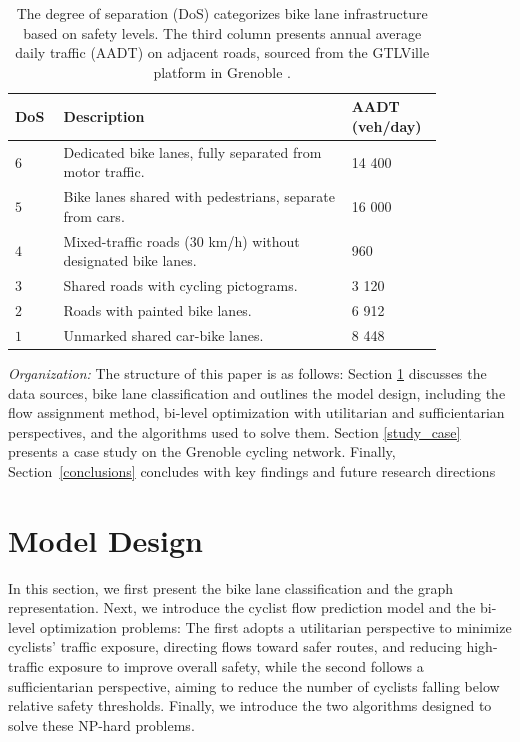 \documentclass[letterpaper, 10 pt, conference]{ieeeconf}  %
\begin{document}
\begin{table}[t]
\centering
\vspace{0.2cm}
\begin{tabular}{|>{\centering\arraybackslash}p{0.1\linewidth}|p{0.60
\linewidth}|C{0.15\linewidth}|}
\hline
\textbf{DoS}   & \textbf{Description} & \textbf{AADT (veh/day)} \\
\hline
$6$  & Dedicated bike lanes, fully separated from motor traffic. & 14 400 \\

$5$  & Bike lanes shared with pedestrians, separate from cars. & 16 000 \\ 

$4$  & Mixed-traffic roads (30 km/h) without designated bike lanes. & 960  \\

$3$  & Shared roads with cycling pictograms. & 3 120 \\

$2$  & Roads with painted bike lanes.  & 6 912 \\

$1$  & Unmarked shared car-bike lanes. & 8 448 \\
\hline
\end{tabular}
\caption{\footnotesize The degree of separation (DoS) categorizes bike lane infrastructure based on safety levels. The third column presents annual average daily traffic (AADT) on adjacent roads, sourced from the GTLVille platform in Grenoble \cite{gtlville2024}.}
\label{dos_table}
\end{table}

\textit{Organization:} The structure of this paper is as follows: Section  \ref{model_design} discusses the data sources, bike lane classification and outlines the model design, including the flow assignment method, bi-level optimization with utilitarian and sufficientarian perspectives, and the algorithms used to solve them. Section \ref{study_case} presents a case study on the Grenoble cycling network. Finally, Section~\ref{conclusions} concludes with key findings and future research directions
\section{Model Design}
\label{model_design}
In this section, we first present the bike lane classification and the graph representation. Next, we introduce the cyclist flow prediction model and the bi-level optimization problems: The first adopts a utilitarian perspective to minimize cyclists' traffic exposure, directing flows toward safer routes, and reducing high-traffic exposure to improve overall safety, while the second follows a sufficientarian perspective, aiming to reduce the number of cyclists falling below relative safety thresholds. Finally, we introduce the two algorithms designed to solve these NP-hard problems.
\end{document}
